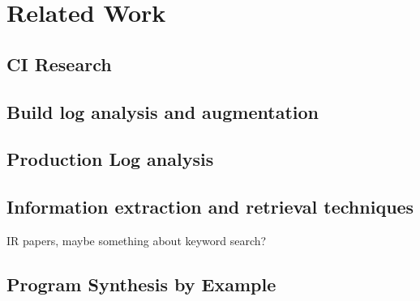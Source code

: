\documentclass[\myrootdir/main.tex]{subfiles}
\begin{document}
\chapter{Related Work}

\section{CI Research}
\section{Build log analysis and augmentation}
\section{Production Log analysis}
\section{Information extraction and retrieval techniques}
IR papers, maybe something about keyword search?
\section{Program Synthesis by Example}
\end{document}
